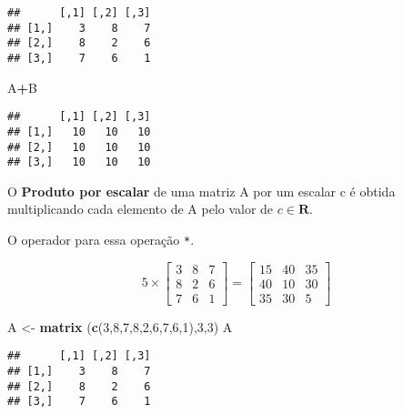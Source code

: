 \documentclass[
]{book}
\newenvironment{Shaded}{\begin{snugshade}}{\end{snugshade}}
\newcommand{\DecValTok}[1]{\textcolor[rgb]{0.00,0.00,0.81}{#1}}
\newcommand{\KeywordTok}[1]{\textcolor[rgb]{0.13,0.29,0.53}{\textbf{#1}}}
\newcommand{\NormalTok}[1]{#1}
\newcommand{\OperatorTok}[1]{\textcolor[rgb]{0.81,0.36,0.00}{\textbf{#1}}}
\newcommand{\StringTok}[1]{\textcolor[rgb]{0.31,0.60,0.02}{#1}}
\begin{document}
\begin{verbatim}
##      [,1] [,2] [,3]
## [1,]    3    8    7
## [2,]    8    2    6
## [3,]    7    6    1
\end{verbatim}

\begin{Shaded}
\begin{Highlighting}[]
\NormalTok{A}\OperatorTok{+}\NormalTok{B}
\end{Highlighting}
\end{Shaded}

\begin{verbatim}
##      [,1] [,2] [,3]
## [1,]   10   10   10
## [2,]   10   10   10
## [3,]   10   10   10
\end{verbatim}

O \textbf{Produto por escalar} de uma matriz A por um escalar c é obtida multiplicando cada elemento de A pelo valor de \(c \in \mathbf{R}\).

O operador para essa operação \texttt{*}.

\begin{equation*}
5 \times
\begin{bmatrix}
3 & 8 & 7\\
8 & 2 & 6\\
7 & 6 & 1
\end{bmatrix} = 
\begin{bmatrix}
15 & 40 & 35\\
40 & 10 & 30\\
35 & 30 & 5
\end{bmatrix}
\end{equation*}

\begin{Shaded}
\begin{Highlighting}[]
\NormalTok{A \textless{}{-}}\StringTok{ }\KeywordTok{matrix}\NormalTok{ (}\KeywordTok{c}\NormalTok{(}\DecValTok{3}\NormalTok{,}\DecValTok{8}\NormalTok{,}\DecValTok{7}\NormalTok{,}\DecValTok{8}\NormalTok{,}\DecValTok{2}\NormalTok{,}\DecValTok{6}\NormalTok{,}\DecValTok{7}\NormalTok{,}\DecValTok{6}\NormalTok{,}\DecValTok{1}\NormalTok{),}\DecValTok{3}\NormalTok{,}\DecValTok{3}\NormalTok{)}
\NormalTok{A}
\end{Highlighting}
\end{Shaded}

\begin{verbatim}
##      [,1] [,2] [,3]
## [1,]    3    8    7
## [2,]    8    2    6
## [3,]    7    6    1
\end{verbatim}
\end{document}
